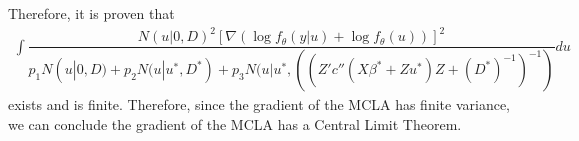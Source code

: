 \documentclass{article}
\begin{document}
Therefore, it is proven that 
\begin{align}
\int \dfrac{N(u|0,D)^2 \left[\nabla \left(\log f_\theta(y|u)+\log f_\theta (u) \right) \right]^2}{p_1 N(u|0,D)+p_2 N(u|u^*, D^*) + p_3 N(u|u^*, ((Z'  c''(X \beta^*+Zu^*) Z +(D^*)^{-1}   )^{-1})} du 
\end{align}
exists and is finite. Therefore, since  the gradient of the MCLA has finite variance, we can conclude the gradient of the MCLA has a Central Limit Theorem.

%
\end{document}
